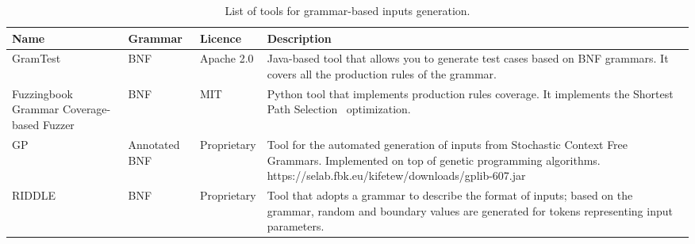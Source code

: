 \begin{table}[h]
\caption{List of tools for grammar-based inputs generation.}
\label{table:grammarGeneration}
\begin{center}
\tiny
\begin{tabular}{|p{2cm}|p{2cm}|p{2cm}|p{7cm}|}
\hline
\textbf{Name}&\textbf{Grammar}&\textbf{Licence}&\textbf{Description}\\
\hline
GramTest~\cite{GramTest}& BNF&Apache 2.0&Java-based tool that allows you to generate test cases based on BNF grammars. It covers all the production rules of the grammar.\\
\hline
Fuzzingbook Grammar Coverage-based Fuzzer~\cite{fuzzingbook2019:GrammarFuzzer}& BNF & MIT &Python tool that implements production rules coverage. It implements the Shortest Path Selection~\cite{Burkhardt:TestFromSyntax} optimization.\\
\hline
GP~\cite{GPlib,Kifetew:GBTest:2017}& Annotated BNF & Proprietary& Tool for the automated generation of inputs from Stochastic Context Free Grammars. Implemented on top of genetic programming algorithms. https://selab.fbk.eu/kifetew/downloads/gplib-607.jar\\
\hline
RIDDLE~\cite{ghosh1998testing}&BNF& Proprietary& Tool that adopts a grammar to describe the format of inputs; based on the grammar, random and boundary values are generated for tokens representing input parameters.\\
\hline
\end{tabular}
\end{center}
\end{table}%